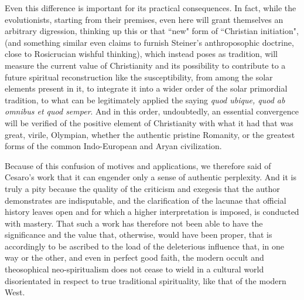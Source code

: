 Even this difference is important for its practical consequences. In fact, while the evolutionists, starting from their premises, even here will grant themselves an arbitrary digression, thinking up this or that ``new" form of ``Christian initiation", (and something similar even claims to furnish Steiner's anthroposophic doctrine, close to Rosicrucian wishful thinking), which instead poses as tradition, will measure the current value of Christianity and its possibility to contribute to a future spiritual reconstruction like the susceptibility, from among the solar elements present in it, to integrate it into a wider order of the solar primordial tradition, to what can be legitimately applied the saying \emph{quod ubique, quod ab omnibus et quod semper}. And in this order, undoubtedly, an essential convergence will be verified of the positive element of Christianity with what it had that was great, virile, Olympian, whether the authentic pristine Romanity, or the greatest forms of the common Indo-European and Aryan civilization.

Because of this confusion of motives and applications, we therefore said of Cesaro's work that it can engender only a sense of authentic perplexity. And it is truly a pity because the quality of the criticism and exegesis that the author demonstrates are indisputable, and the clarification of the lacunae that official history leaves open and for which a higher interpretation is imposed, is conducted with mastery. That such a work has therefore not been able to have the significance and the value that, otherwise, would have been proper, that is accordingly to be ascribed to the load of the deleterious influence that, in one way or the other, and even in perfect good faith, the modern occult and theosophical neo-spiritualism does not cease to wield in a cultural world disorientated in respect to true traditional spirituality, like that of the modern West.

